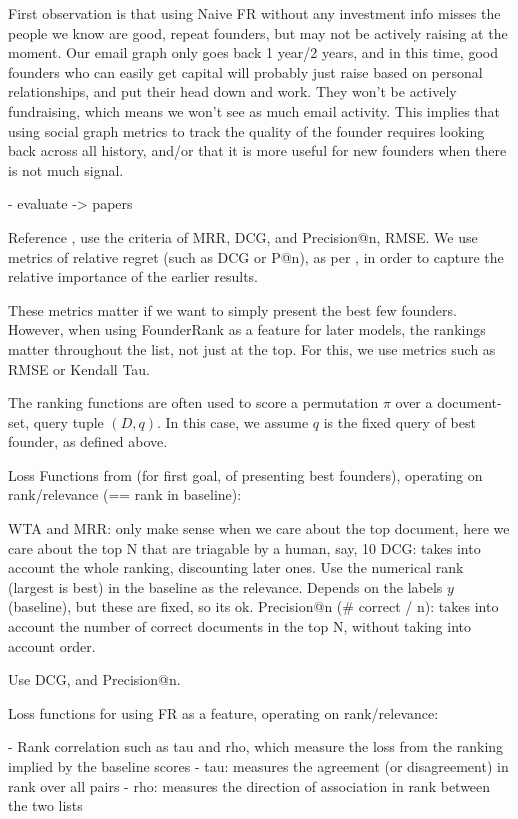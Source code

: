 First observation is that using Naive FR without any investment info misses the people we know are good, repeat founders, but may not be actively raising at the moment. Our email graph only goes back 1 year/2 years, and in this time, good founders who can easily get capital will probably just raise based on personal relationships, and put their head down and work. They won't be actively fundraising, which means we won't see as much email activity. This implies that using social graph metrics to track the quality of the founder requires looking back across all history, and/or that it is more useful for new founders when there is not much signal.

- evaluate -> papers

Reference \cite{DBLP:journals/corr/abs-0704-3359}, use the criteria of MRR, DCG, and Precision@n, RMSE. We use metrics of relative regret (such as DCG or P@n), as per \cite{DBLP:journals/corr/abs-0704-3359}, in order to capture the relative importance of the earlier results.

These metrics matter if we want to simply present the best few founders. However, when using FounderRank as a feature for later models, the rankings matter throughout the list, not just at the top. For this, we use metrics such as RMSE or Kendall Tau.

The ranking functions are often used to score a permutation $\pi$ over a document-set, query tuple $(D, q)$. In this case, we assume $q$ is the fixed query of best founder, as defined above.

Loss Functions from \cite{DBLP:journals/corr/abs-0704-3359} (for first goal, of presenting best founders), operating on rank/relevance (== rank in baseline):

WTA and MRR: only make sense when we care about the top document, here we care about the top N that are triagable by a human, say, 10
DCG: takes into account the whole ranking, discounting later ones. Use the numerical rank (largest is best) in the baseline as the relevance. Depends on the labels $y$ (baseline), but these are fixed, so its ok.
Precision@n (\# correct / n): takes into account the number of correct documents in the top N, without taking into account order.

Use DCG, and Precision@n.

Loss functions for using FR as a feature, operating on rank/relevance:

- Rank correlation such as tau and rho, which measure the loss from the ranking implied by the baseline scores
  - tau: measures the agreement (or disagreement) in rank over all pairs
  - rho: measures the direction of association in rank between the two lists

